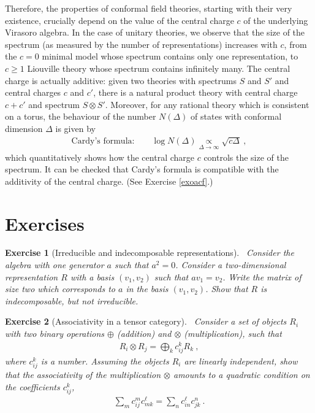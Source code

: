 \documentclass[12pt,a4paper,notitlepage]{report}
\numberwithin{equation}{section}
\theoremstyle{break}
\newtheorem{exo}{Exercise}[chapter]
\begin{document}
Therefore,
the properties of conformal field theories, starting with their very existence, crucially depend on the value of the central charge $c$ of the underlying Virasoro algebra.
In the case of unitary theories, we observe that the size of the spectrum (as measured by the number of representations) increases with $c$, from the $c=0$ minimal model whose spectrum contains only one representation, to $c\geq 1$ Liouville theory whose spectrum contains infinitely many.
The central charge is actually additive: given two theories with spectrums $S$ and $S'$ and central charges $c$ and $c'$, there is a natural product theory with central charge $c+c'$ and spectrum $S\otimes S'$.
Moreover, for any rational theory which is consistent on a torus, 
the behaviour of the number $N(\Delta)$ of states with conformal dimension $\Delta$ is given by 
\begin{align}
\text{Cardy's formula:} \qquad \log N(\Delta) \underset{\Delta\rightarrow \infty}{\propto} \sqrt{c \Delta} \ ,
\label{nds}
\end{align}
which quantitatively shows how the central charge $c$ controls the size of the spectrum.
It can be checked that Cardy's formula is compatible with the additivity of the central charge. (See Exercise \ref{exoacf}.)

\section{Exercises}


\begin{exo}[Irreducible and indecomposable representations] 
~\label{exoirr}
Consider the algebra with one generator $a$ such that $a^2 = 0$.
Consider a two-dimensional representation $R$ with a basis $(v_1,v_2)$ such that $av_1=v_2$.
Write the matrix of size two which corresponds to $a$ in the basis $(v_1,v_2)$.
Show that $R$ is indecomposable, but not irreducible. 
\end{exo}

\begin{exo}[Associativity in a tensor category]
 ~\label{exoten}
Consider a set of objects $R_i$ with two binary operations $\oplus$ (addition) and $\otimes$ (multiplication), such that 
\begin{align}
 R_i \otimes R_j = \bigoplus_k c_{ij}^k R_k\ ,
\end{align}
where $c_{ij}^k$ is a number.
Assuming the objects $R_i$ are linearly independent, show that the associativity of the multiplication $\otimes$ amounts to a quadratic condition on the coefficients $c_{ij}^k$,
\begin{align}
 \sum_m c_{ij}^m c_{mk}^\ell = \sum_n c_{in}^\ell c_{jk}^n\ .
\end{align}
\end{exo}
\end{document}
